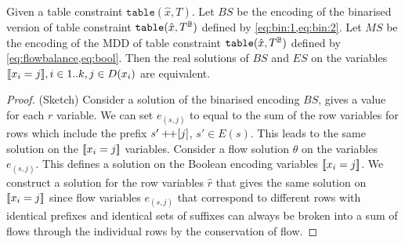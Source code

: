 \documentclass[a4paper,UKenglish,cleveref,autoref,thm-restate]{lipics-v2021}
\begin{document}
\setcounter{theorem}{6}
\begin{theorem}
   Given a table constraint $\texttt{table}(\hat{x},T)$.
    Let $BS$ be the encoding of the binarised version of  table constraint $\texttt{table}(\hat{x},T^{\mathbb{B}})$  defined
    by \cref{eq:bin:1,eq:bin:2}.
    Let $MS$ be the encoding of the MDD of  table constraint $\texttt{table}(\hat{x},T^{\mathbb{B}})$  defined
    by \cref{eq:flowbalance,eq:bool}.
    Then the real solutions of $BS$ and $ES$ on the variables 
    $\be{i}{j}, i \in 1..k, j \in D(x_i)$ are equivalent.
\begin{proof}
   (Sketch) Consider a solution of the binarised encoding $BS$, gives a value for each $r$ variable.  We can set 
   $e_{(s,j)}$ to equal to the sum of the row variables for rows which include the prefix $s' +\!\!+ [j]$, $s' \in E(s)$.  This leads to the same solution on the $\be{i}{j}$ variables. 
    Consider a flow solution $\theta$ on the variables $e_{(s,j)}$. This defines a solution on the Boolean encoding variables $[\![x_i = j]\!]$. 
    We construct a solution for the row variables $\hat{r}$ that gives the same solution on $[\![x_i = j]\!]$
    since flow variables $e_{(s,j)}$ that correspond to different rows with identical prefixes and identical sets of suffixes can always be broken into a sum of flows through the individual rows by the conservation of flow.
\end{proof}
\end{theorem}

\setcounter{theorem}{10}
\end{document}

